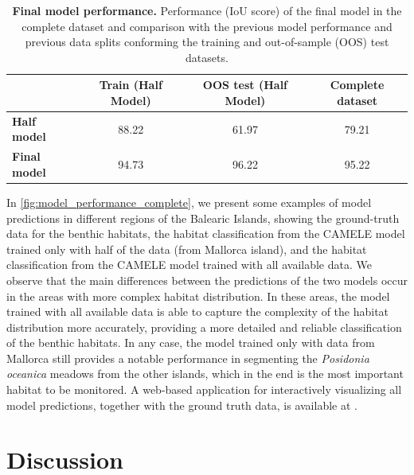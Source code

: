 \begin{table}[H]
    \centering
    \caption[Final model performance]{\textbf{Final model performance.}
        Performance (IoU score) of the final model in the complete dataset
        and
        comparison with the previous model performance and previous data splits
        conforming the training and out-of-sample (OOS) test datasets.}
    \label{tab:my-table}
    \begin{tabular}{lccc}
        \hline
                                       & \textbf{Train (Half Model)}
                                       &
        \textbf{OOS test (Half Model)} &
        \textbf{Complete
            dataset}
        \\
        \hline
        \textbf{Half model}            & 88.22
                                       & 61.97                       &
        79.21
        \\
        \textbf{Final model}           & 94.73
                                       & 96.22                       &
        95.22
        \\\hline
    \end{tabular}
\end{table}

In \cref{fig:model_performance_complete}, we present some examples of model
predictions in different regions of the Balearic Islands, showing the
ground-truth data for the benthic habitats, the habitat classification from
the CAMELE model trained only with half of the data (from Mallorca island), and
the habitat classification from the CAMELE model trained with all available
data. We observe that the main differences between the predictions of the two
models occur in the areas with more complex habitat distribution. In these
areas, the model trained with all available data is able to capture the
complexity of the habitat distribution more accurately, providing a more
detailed and reliable classification of the benthic habitats. In any case, the
model trained only with data from Mallorca still provides a notable performance
in segmenting the \textit{Posidonia oceanica} meadows from the other islands,
which in the end is the most important habitat to be monitored. A web-based
application for interactively visualizing all model predictions, together
with the ground truth data, is available at \cite{Webpage_camele}.

\section{Discussion}

